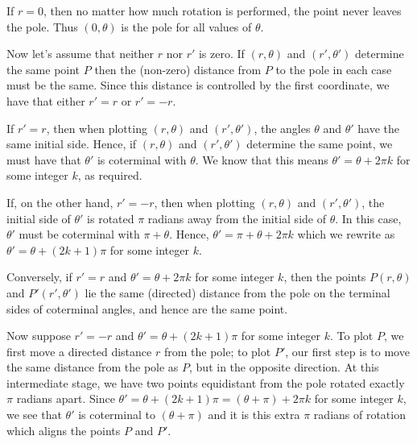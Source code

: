 \documentclass{ximera}
\begin{document}
\smallskip

 If $r = 0$, then no matter how much rotation is performed, the point never leaves the pole.  Thus $(0, \theta)$ is the pole for all values of $\theta$.  
 
 \smallskip
 
 Now let's assume that neither $r$ nor $r'$ is zero.  If $\left(r, \theta\right)$ and $\left(r', \theta'\right)$ determine the same point $P$ then the (non-zero) distance from $P$ to the pole in each case must be the same.  Since this distance is controlled by the first coordinate, we have that either $r' = r$ or $r' = -r$.  
 
 \smallskip
 
 If $r' = r$, then when plotting $\left(r, \theta\right)$ and $\left(r', \theta'\right)$, the angles $ \theta$ and $ \theta'$ have the same initial side.  Hence, if $\left(r, \theta\right)$ and $\left(r', \theta'\right)$ determine the same point,   we must have that $\theta'$  is coterminal with  $\theta$.  We know that this means $\theta' = \theta + 2\pi k$ for some integer $k$, as required. 
 
 \smallskip
 
  If, on the other hand, $r' = -r$, then when plotting $\left(r, \theta\right)$ and $\left(r', \theta'\right)$, the initial side of $ \theta'$ is rotated $\pi$ radians away from the initial side of $\theta$.  In this case, $ \theta'$ must be coterminal with $\pi +  \theta$.  Hence, $ \theta' = \pi +  \theta + 2\pi k$ which we rewrite as $\theta' =  \theta + (2k+1)\pi$ for some integer $k$. 
  
  \smallskip
  
  Conversely, if $r' = r$ and $\theta' =  \theta + 2\pi k$ for some integer $k$, then  the points $P\left(r, \theta\right)$ and $P'\left(r', \theta'\right)$ lie the same (directed) distance from the pole on the terminal sides of coterminal angles, and hence are the same point.  
  
  \smallskip
  
Now suppose  $r' = -r$ and $\theta' = \theta + (2k + 1) \pi$ for some integer $k$.  To plot $P$, we first move a directed distance $r$ from the pole;  to plot $P'$, our first step is to move the same distance from the pole as $P$, but in the opposite direction.  At this intermediate stage, we have two points equidistant from the pole rotated exactly $\pi$ radians apart.  Since  $\theta' =  \theta + (2k + 1) \pi = \left(\theta + \pi\right) + 2\pi k $ for some integer $k$,  we see that $\theta'$ is coterminal to $\left(\theta + \pi\right)$ and it is this extra $\pi$ radians of rotation which aligns the points $P$ and $P'$.
\end{document}
